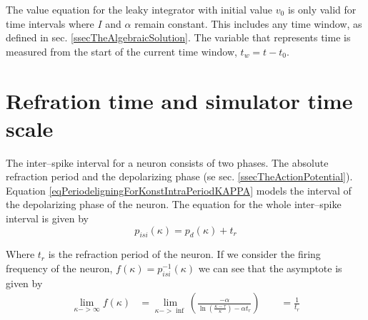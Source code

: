 	The value equation for the leaky integrator with initial value $v_0$ is only valid for time intervals where $I$ and $\alpha$ remain constant.
	This includes any time window, as defined in sec. \ref{ssecTheAlgebraicSolution}.
	The variable that represents time is measured from the start of the current time window, $t_w = t - t_0$.






\section{Refration time and simulator time scale}

The inter--spike interval for a neuron consists of two phases. 
The absolute refraction period and the depolarizing phase (se sec. \ref{ssecTheActionPotential}).
Equation \eqref{eqPeriodeligningForKonstIntraPeriodKAPPA} models the interval of the depolarizing phase of the neuron. %
The equation for the whole inter--spike interval is given by
\begin{equation}
	p_{isi}(\kappa) = p_d(\kappa) + t_r
	\label{eqHeilePerioden}
\end{equation}

Where $t_r$ is the refraction period of the neuron. %
If we consider the firing frequency of the neuron, $f(\kappa) = p_{isi}^{-1}(\kappa)$ we can see that the asymptote is given by
\begin{equation}
	\begin{split}
		\lim_{\kappa->\infty}{ f(\kappa)} &= \lim_{\kappa->\inf}\left( \frac{-\alpha}{\ln \left( \frac{\kappa - \tau}{\kappa} \right) - \alpha t_r} \right)   \qquad = \frac{1}{t_r} \\ 
	\end{split}
	\label{eqFrekvensLlim} 
\end{equation}

